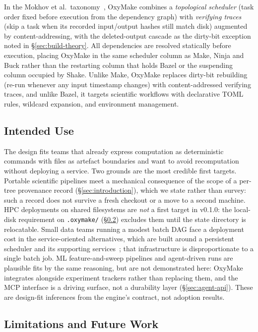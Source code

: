 \documentclass[12pt,a4paper]{article}
\newcommand{\code}[1]{{\texttt{\small\color{inlinecode}#1}}}
\begin{document}
In the Mokhov et al.\ taxonomy~\cite[\S4--5]{mokhovBuildSystemsCarte2020}, OxyMake
combines a \emph{topological scheduler} (task order fixed before execution
from the dependency graph) with \emph{verifying traces} (skip a task when
its recorded input/output hashes still match disk) augmented by
content-addressing, with the deleted-output cascade as the dirty-bit
exception noted in \S\ref{sec:build-theory}.  All dependencies are resolved statically before
execution, placing OxyMake in the same scheduler column as Make, Ninja
and Buck rather than the restarting column that holds Bazel or the
suspending column occupied by Shake.  Unlike
Make, OxyMake replaces dirty-bit rebuilding (re-run whenever any input
timestamp changes) with content-addressed verifying traces, and unlike
Bazel, it targets scientific workflows with declarative TOML rules,
wildcard expansion, and environment management.

\subsection{Intended Use}

The design fits teams that already express computation as deterministic
commands with files as artefact boundaries and want to avoid recomputation
without deploying a service. Two grounds are the most credible first
targets. Portable scientific pipelines meet a mechanical consequence of
the scope of a per-tree provenance record (\S\ref{sec:introduction}),
which we state rather than survey: such a record does not survive a
fresh checkout or a move to a second machine. HPC deployments on shared filesystems are \emph{not} a
first target in v0.1.0: the local-disk requirement on \code{.oxymake/}
(\S\ref{sec:limitations}) excludes them until the state directory is
relocatable. Small
data teams running a modest batch DAG face a deployment cost in the
service-oriented alternatives, which are built around a persistent
scheduler and its supporting services~\cite{airflow}; that
infrastructure is disproportionate to a single batch job. ML
feature-and-sweep pipelines and agent-driven runs are plausible fits by
the same reasoning, but are not demonstrated here: OxyMake integrates
alongside experiment trackers rather than replacing them, and the MCP
interface is a driving surface, not a durability layer
(\S\ref{sec:agent-api}). These are design-fit inferences from the
engine's contract, not adoption results.

\subsection{Limitations and Future Work}
\label{sec:limitations}
\end{document}

